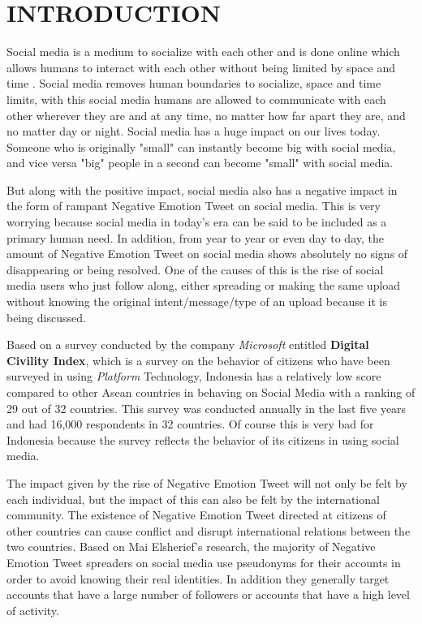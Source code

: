 \section{INTRODUCTION}
\label{sec:pendahuluan}


Social media is a medium to socialize with each other and is done online which allows humans to interact with each other without being limited by space and time \cite{media_sosial}. Social media removes human boundaries to socialize, space and time limits, with this social media humans are allowed to communicate with each other wherever they are and at any time, no matter how far apart they are, and no matter day or night. Social media has a huge impact on our lives today. Someone who is originally "small" can instantly become big with social media, and vice versa "big" people in a second can become "small" with social media.

But along with the positive impact, social media also has a negative impact in the form of rampant Negative Emotion Tweet on social media. This is very worrying because social media in today's era can be said to be included as a primary human need. In addition, from year to year or even day to day, the amount of Negative Emotion Tweet on social media shows absolutely no signs of disappearing or being resolved. One of the causes of this is the rise of social media users who just follow along, either spreading or making the same upload without knowing the original intent/message/type of an upload because it is being discussed\cite{ujaran_kebencian}.


Based on a survey conducted by the company \textit{Microsoft} entitled \textbf{Digital Civility Index}, which is a survey on the behavior of citizens who have been surveyed in using \textit{Platform} Technology, Indonesia has a relatively low score compared to other Asean countries in behaving on Social Media with a ranking of 29 out of 32 countries. This survey was conducted annually in the last five years and had 16,000 respondents in 32 countries. Of course this is very bad for Indonesia because the survey reflects the behavior of its citizens in using social media\cite{dci}.

The impact given by the rise of Negative Emotion Tweet will not only be felt by each individual, but the impact of this can also be felt by the international community. The existence of Negative Emotion Tweet directed at citizens of other countries can cause conflict and disrupt international relations between the two countries. Based on Mai Elsherief's research, the majority of Negative Emotion Tweet spreaders on social media use pseudonyms for their accounts in order to avoid knowing their real identities. In addition they generally target accounts that have a large number of followers or accounts that have a high level of activity\cite{dampak_kebencian}.

